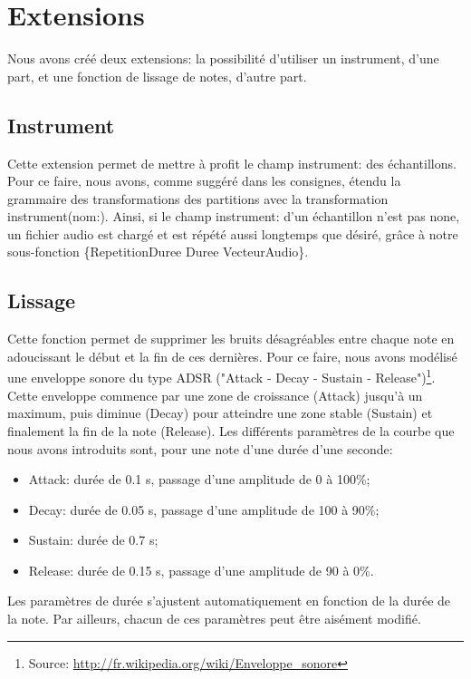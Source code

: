 \documentclass[10pt,a4paper]{article}
\begin{document}
\section{Extensions}
Nous avons créé deux extensions: la possibilité d'utiliser un instrument, d'une part, et une fonction de lissage de notes, d'autre part.

\subsection{Instrument}
Cette extension permet de mettre à profit le champ instrument: des échantillons. Pour ce faire, 
nous avons, comme suggéré dans les consignes, étendu la grammaire des transformations des 
partitions avec la transformation instrument(nom:). 
Ainsi, si le champ instrument: d'un échantillon n'est pas none, un fichier audio est chargé
et est répété aussi longtemps que désiré, grâce à notre sous-fonction \{RepetitionDuree Duree VecteurAudio\}. 

\subsection{Lissage}
Cette fonction permet de supprimer les bruits désagréables entre chaque note en adoucissant 
le début et la fin de ces dernières. Pour ce faire, nous avons modélisé une enveloppe sonore 
du type ADSR ("Attack - Decay - Sustain - Release")\footnote{Source: \url{http://fr.wikipedia.org/wiki/Enveloppe_sonore}}.
Cette enveloppe commence par une zone de croissance (Attack) jusqu'à un maximum, puis diminue (Decay) pour atteindre 
une zone stable (Sustain) et finalement la fin de la note (Release). Les différents paramètres de la courbe que 
nous avons introduits sont, pour une note d'une durée d'une seconde: 

\begin{itemize}
	\item Attack: durée de 0.1 s, passage d'une amplitude de 0 à 100\%;
	\item Decay: durée de 0.05 s, passage d'une amplitude de 100 à 90\%;
	\item Sustain: durée de 0.7 s;
	\item Release: durée de 0.15 s, passage d'une amplitude de 90 à 0\%.
\end{itemize}

Les paramètres de durée s'ajustent automatiquement en fonction de la durée de la note. 
Par ailleurs, chacun de ces paramètres peut être aisément modifié. 
\end{document}

